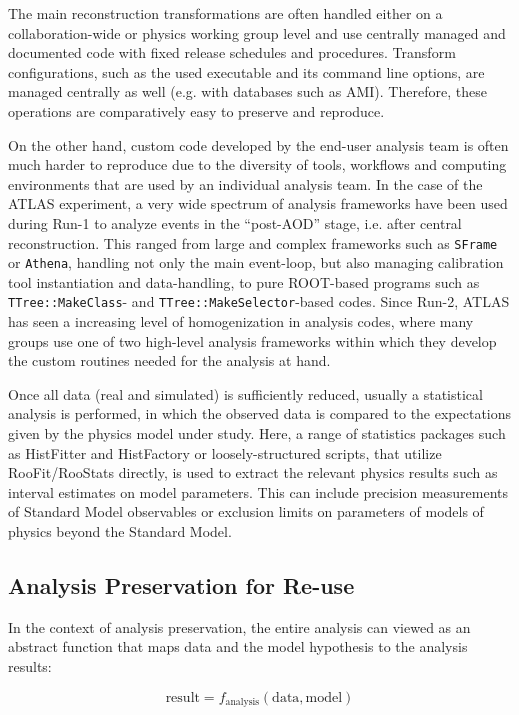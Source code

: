 \documentclass[a4paper]{jpconf}
\begin{document}
The main reconstruction transformations are often handled either on a collaboration-wide or physics working group level and use centrally managed and documented code with fixed release schedules and procedures. Transform configurations, such as the used executable and its command line options, are managed centrally as well (e.g. with databases such as AMI\cite{AMI2010}). Therefore, these operations are comparatively easy to preserve and reproduce.

On the other hand, custom code developed by the end-user analysis team is often much harder to reproduce due to the diversity of tools, workflows and computing environments that are used by an individual analysis team. In the case of the ATLAS experiment, a very wide spectrum of analysis frameworks have been used during Run-1 to analyze events in the ``post-AOD'' stage, i.e. after central reconstruction. This ranged from large and complex frameworks such as \texttt{SFrame} or \texttt{Athena}, handling not only the main event-loop, but also managing calibration tool instantiation and data-handling, to pure ROOT-based programs such as \texttt{TTree::MakeClass}- and \texttt{TTree::MakeSelector}-based codes. Since Run-2, ATLAS has seen a increasing level of homogenization in analysis codes, where many groups use one of two high-level analysis frameworks within which they develop the custom routines needed for the analysis at hand.

Once all data (real and simulated) is sufficiently reduced, usually a statistical analysis is performed, in which the observed data is compared to the expectations given by the physics model under study. Here, a range of statistics packages such as HistFitter and HistFactory or loosely-structured scripts, that utilize RooFit/RooStats directly, is used to extract the relevant physics results such as interval estimates on model parameters. This can include precision measurements of Standard Model observables or exclusion limits on parameters of models of physics beyond the Standard Model.

\subsection{Analysis Preservation for Re-use}
In the context of analysis preservation, the entire analysis can viewed as an abstract function that maps data and the model hypothesis to the analysis results:

\begin{equation}
	\textrm{result} = f_{\textrm{analysis}}(\textrm{data}, \textrm{model})
\end{equation}
\end{document}
